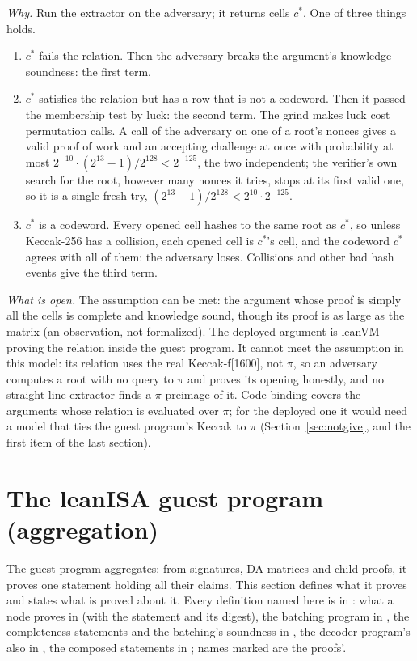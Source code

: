 \documentclass[11pt]{article}
\begin{document}
\emph{Why.} Run the extractor on the adversary; it returns cells $c^*$. One of three things holds.
\begin{enumerate}
\item $c^*$ fails the relation. Then the adversary breaks the argument's knowledge soundness:
the first term.
\item $c^*$ satisfies the relation but has a row that is not a codeword. Then it passed the
membership test by luck: the second term. The grind makes luck cost permutation calls. A call of
the adversary on one of a root's nonces gives a valid proof of work and an accepting challenge at
once with probability at most $2^{-10}\cdot(2^{13}-1)/2^{128} < 2^{-125}$, the two independent;
the verifier's own search for the root, however many nonces it tries, stops at its first valid
one, so it is a single fresh try, $(2^{13}-1)/2^{128} < 2^{10}\cdot 2^{-125}$.
\item $c^*$ is a codeword. Every opened cell hashes to the same root as $c^*$, so unless Keccak-256
has a collision, each opened cell is $c^*$'s cell, and the codeword $c^*$ agrees with all of them:
the adversary loses. Collisions and other bad hash events give the third term.
\end{enumerate}

\emph{What is open.} The assumption can be met: the argument whose proof is simply all the cells
is complete and knowledge sound, though its proof is as large as the matrix (an observation, not
formalized). The deployed argument is leanVM proving the relation inside the guest program. It cannot
meet the assumption in this model: its relation uses the real Keccak-f[1600], not $\pi$, so an
adversary computes a root with no query to $\pi$ and proves its opening honestly, and no
straight-line extractor finds a $\pi$-preimage of it. Code binding covers the arguments whose
relation is evaluated over $\pi$; for the deployed one it would need a model that ties the guest
program's Keccak to $\pi$ (Section~\ref{sec:notgive}, and the first item of the last section).

\section{The leanISA guest program (aggregation)}\label{sec:guest}

The guest program aggregates: from signatures, DA matrices and child proofs, it proves one statement
holding all their claims. This section defines what it proves and states what is proved about it.
Every definition named here is in : what a node proves in
 (with the statement and its digest), the batching program
in , the completeness statements and the batching's
soundness in , the decoder program's also in
, the composed statements in ; names
marked  are the proofs'.
\end{document}
